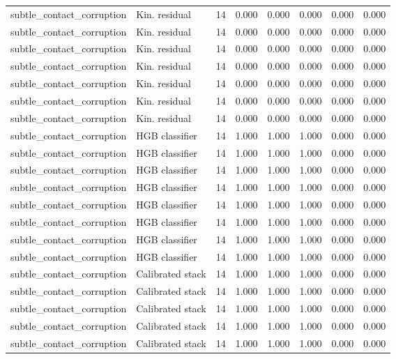 {\begin{longtable}{llrrrrrr}
subtle\_contact\_corruption & Kin. residual & 14 & 0.000 & 0.000 & 0.000 & 0.000 & 0.000 \\
subtle\_contact\_corruption & Kin. residual & 14 & 0.000 & 0.000 & 0.000 & 0.000 & 0.000 \\
subtle\_contact\_corruption & Kin. residual & 14 & 0.000 & 0.000 & 0.000 & 0.000 & 0.000 \\
subtle\_contact\_corruption & Kin. residual & 14 & 0.000 & 0.000 & 0.000 & 0.000 & 0.000 \\
subtle\_contact\_corruption & Kin. residual & 14 & 0.000 & 0.000 & 0.000 & 0.000 & 0.000 \\
subtle\_contact\_corruption & Kin. residual & 14 & 0.000 & 0.000 & 0.000 & 0.000 & 0.000 \\
subtle\_contact\_corruption & Kin. residual & 14 & 0.000 & 0.000 & 0.000 & 0.000 & 0.000 \\
subtle\_contact\_corruption & HGB classifier & 14 & 1.000 & 1.000 & 1.000 & 0.000 & 0.000 \\
subtle\_contact\_corruption & HGB classifier & 14 & 1.000 & 1.000 & 1.000 & 0.000 & 0.000 \\
subtle\_contact\_corruption & HGB classifier & 14 & 1.000 & 1.000 & 1.000 & 0.000 & 0.000 \\
subtle\_contact\_corruption & HGB classifier & 14 & 1.000 & 1.000 & 1.000 & 0.000 & 0.000 \\
subtle\_contact\_corruption & HGB classifier & 14 & 1.000 & 1.000 & 1.000 & 0.000 & 0.000 \\
subtle\_contact\_corruption & HGB classifier & 14 & 1.000 & 1.000 & 1.000 & 0.000 & 0.000 \\
subtle\_contact\_corruption & HGB classifier & 14 & 1.000 & 1.000 & 1.000 & 0.000 & 0.000 \\
subtle\_contact\_corruption & HGB classifier & 14 & 1.000 & 1.000 & 1.000 & 0.000 & 0.000 \\
subtle\_contact\_corruption & Calibrated stack & 14 & 1.000 & 1.000 & 1.000 & 0.000 & 0.000 \\
subtle\_contact\_corruption & Calibrated stack & 14 & 1.000 & 1.000 & 1.000 & 0.000 & 0.000 \\
subtle\_contact\_corruption & Calibrated stack & 14 & 1.000 & 1.000 & 1.000 & 0.000 & 0.000 \\
subtle\_contact\_corruption & Calibrated stack & 14 & 1.000 & 1.000 & 1.000 & 0.000 & 0.000 \\
subtle\_contact\_corruption & Calibrated stack & 14 & 1.000 & 1.000 & 1.000 & 0.000 & 0.000 \\

\end{longtable}}
